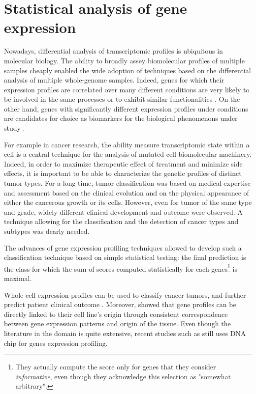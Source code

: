 \section{Statistical analysis of gene expression}

	Nowadays, differential analysis of transcriptomic profiles is ubiquitous in molecular biology.
	The ability to broadly assey biomolecular profiles of multiple samples cheaply enabled the wide adoption of techniques based on the differential analysis of multiple whole-genome samples.
	Indeed, genes for which their expression profiles are correlated over many different conditions are very likely to be involved in the same processes or to exhibit similar functionalities \parencite{ideker2002discovering}.
	On the other hand, genes with significantly different expression profiles under conditions are candidates for choice as biomarkers for the biological phenomenons under study \parencite{altman2001whole}.

	For example in cancer research, the ability measure transcriptomic state within a cell is a central technique for the analysis of mutated cell biomolecular machinery.
	Indeed, in order to maximize therapeutic effect of treatment and minimize side effects, it is important to be able to characterize the genetic profiles of distinct tumor types.
	For a long time, tumor classification was based on medical expertise and assessment based on the clinical evolution and on the physical appearance of either the cancerous growth or its cells.
	However, even for tumor of the same type and grade, widely different clinical development and outcome were observed.
	A technique allowing for the classification and the detection of cancer types and subtypes was dearly needed.

	The advances of gene expression profiling techniques allowed \textcite{golub1999molecular} to develop such a classification technique based on simple statistical testing: the final prediction is the class for which the sum of scores computed statistically for each genes\footnote{They actually compute the score only for genes that they consider \emph{informative}, even though they acknowledge this selection as "somewhat arbitrary".} is maximal.


	Whole cell expression profiles can be used to classify cancer tumors, and further predict patient clinical outcome \parencites{perou2000molecular}{sorlie2001gene}{vantveer2002gene}{vijver2002gene}.
	Moreover, \textcite{ross2000systematic} showed that gene profiles can be directly linked to their cell line's origin through consistent correspondence between gene expression patterns and origin of the tissue.
	Even though the literature in the domain is quite extensive, recent studies such as \parencite{estevez2015gene} still uses DNA chip for genes expression profiling.

